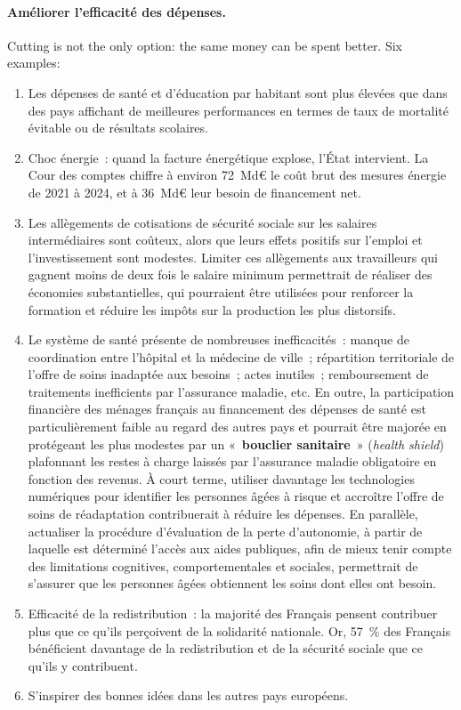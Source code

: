 \paragraph{Améliorer l'efficacité des dépenses.}
Cutting is not the only option: the same money can be spent better. Six
examples:
\begin{enumerate}
  \item Les dépenses de santé et d'éducation par habitant sont plus élevées que
    dans des pays affichant de meilleures performances en termes de taux de
    mortalité évitable ou de résultats scolaires.
  \item Choc énergie~: quand la facture énergétique explose, l'État intervient.
    La Cour des comptes chiffre à environ 72~Md€ le coût brut des mesures énergie
    de 2021 à 2024, et à 36~Md€ leur besoin de financement net.
  \item Les allègements de cotisations de sécurité sociale sur les salaires
    intermédiaires sont coûteux, alors que leurs effets positifs sur l'emploi et
    l'investissement sont modestes. Limiter ces allègements aux travailleurs qui
    gagnent moins de deux fois le salaire minimum permettrait de réaliser des
    économies substantielles, qui pourraient être utilisées pour renforcer la
    formation et réduire les impôts sur la production les plus distorsifs.
  \item Le système de santé présente de nombreuses inefficacités~: manque de
    coordination entre l'hôpital et la médecine de ville~; répartition
    territoriale de l'offre de soins inadaptée aux besoins~; actes inutiles~;
    remboursement de traitements inefficients par l'assurance maladie, etc. En
    outre, la participation financière des ménages français au financement des
    dépenses de santé est particulièrement faible au regard des autres pays et
    pourrait être majorée en protégeant les plus modestes par un
    «~\textbf{bouclier sanitaire}~» (\textit{health shield}) plafonnant les
    restes à charge laissés par l'assurance maladie obligatoire en fonction des
    revenus. À court terme, utiliser davantage les technologies numériques pour
    identifier les personnes âgées à risque et accroître l'offre de soins de
    réadaptation contribuerait à réduire les dépenses. En parallèle, actualiser
    la procédure d'évaluation de la perte d'autonomie, à partir de laquelle est
    déterminé l'accès aux aides publiques, afin de mieux tenir compte des
    limitations cognitives, comportementales et sociales, permettrait de
    s'assurer que les personnes âgées obtiennent les soins dont elles ont
    besoin.
  \item Efficacité de la redistribution~: la majorité des Français pensent
    contribuer plus que ce qu'ils perçoivent de la solidarité nationale. Or,
    57~\% des Français bénéficient davantage de la redistribution et de la
    sécurité sociale que ce qu'ils y contribuent.
  \item S'inspirer des bonnes idées dans les autres pays européens.
\end{enumerate}
